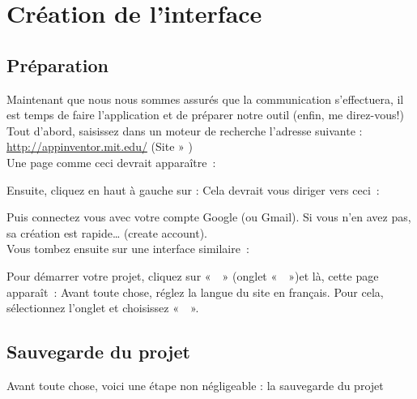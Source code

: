 \chapter{Création de l'interface}
\section{Préparation}
Maintenant que nous nous sommes assurés que la communication s'effectuera, il est temps de faire l'application et de préparer notre outil (enfin, me direz-vous!) \\

\noindent
Tout d'abord, saisissez dans un moteur de recherche l'adresse suivante : 
\url{http://appinventor.mit.edu/} (Site » ) \\

Une page comme ceci devrait apparaître :


Ensuite, cliquez en haut à gauche sur :  
Cela devrait vous diriger vers ceci : \\


Puis connectez vous avec votre compte Google (ou Gmail). Si vous n'en avez pas, sa création est rapide… (create account). \\
Vous tombez ensuite sur une interface similaire : 


\noindent
Pour démarrer votre projet, cliquez sur «  » (onglet «  »)et là, cette page apparaît : 
\noindent 
Avant toute chose, réglez la langue du site en français. Pour cela, sélectionnez l'onglet  et choisissez «  ».\\


\section{Sauvegarde du projet}

Avant toute chose, voici une étape non négligeable : la sauvegarde du projet



